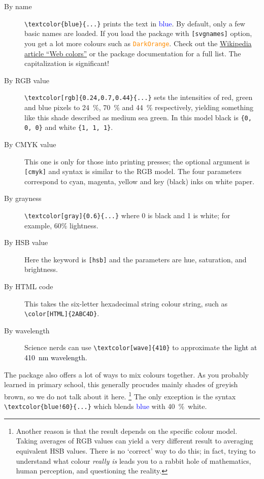 \begin{description}
\item[By name] \verb|\textcolor{blue}{...}| prints the text in \textcolor{blue}{blue}.
    By default, only a few basic names are loaded.
    If you load the package with \verb|[svgnames]| option,
    you get a lot more colours such as \textcolor{DarkOrange}{\texttt{DarkOrange}}.
    Check out the \href{https://en.wikipedia.org/wiki/Web_colors}{Wikipedia article ``Web colors''}
    or the package documentation for a full list.
    The capitalization is significant!
\item[By RGB value] \verb|\textcolor[rgb]{0.24,0.7,0.44}{...}|
    sets the intensities of red, green and blue pixels to 24~\%, 70~\% and 44~\% respectively,
    yielding something like \textcolor[rgb]{0.24,0.7,0.44}{this shade described as medium sea green}.
    In this model black is \verb|{0, 0, 0}| and white \verb|{1, 1, 1}|.
\item[By CMYK value] This one is only for those into printing presses;
    the optional argument is \verb|[cmyk]| and syntax is similar to the RGB model.
    The four parameters correspond to cyan, magenta, yellow and key (black) inks on white paper.
\item[By grayness] \verb|\textcolor[gray]{0.6}{...}|
    where 0 is black and 1 is white;
    \textcolor[gray]{0.6}{for example, 60\% lightness}.
\item[By HSB value] Here the keyword is \verb|[hsb]|
    and the parameters are hue, saturation, and brightness.
\item[By HTML code] This takes the six-letter hexadecimal string colour string,
    such as {\color[HTML]{2ABC4D} \verb|\color[HTML]{2ABC4D}|}.
\item[By wavelength]
    Science nerds can use \verb|\textcolor[wave]{410}|
    to approximate \textcolor[wave]{410}{the light at 410~nm wavelength}.
\end{description}

The package also offers a lot of ways to mix colours together.
As you probably learned in primary school,
this generally procudes mainly shades of greyish brown, so we do not talk about it here.%
\footnote{Another reason is that the result depends on the specific colour model.
Taking averages of RGB values can yield a very different result to averaging equivalent HSB values.
There is no `correct' way to do this;
in fact, trying to understand what colour \emph{really is}
leads you to a rabbit hole of mathematics, human perception, and questioning the reality.}
The only exception is the syntax \verb|\textcolor{blue!60}{...}|
which blends \textcolor{blue}{blue} with \textcolor{blue!60}{40~\%~white}.%
\label{ex:color blending}

